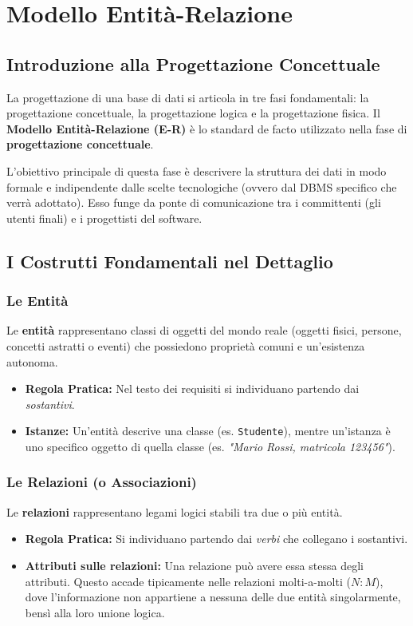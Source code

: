 \chapter{Modello Entità-Relazione}

\section{Introduzione alla Progettazione Concettuale}
La progettazione di una base di dati si articola in tre fasi fondamentali: la progettazione concettuale, la progettazione logica e la progettazione fisica. Il \textbf{Modello Entità-Relazione (E-R)} è lo standard de facto utilizzato nella fase di \textbf{progettazione concettuale}.

L'obiettivo principale di questa fase è descrivere la struttura dei dati in modo formale e indipendente dalle scelte tecnologiche (ovvero dal DBMS specifico che verrà adottato). Esso funge da ponte di comunicazione tra i committenti (gli utenti finali) e i progettisti del software.

\section{I Costrutti Fondamentali nel Dettaglio}

\subsection{Le Entità}
Le \textbf{entità} rappresentano classi di oggetti del mondo reale (oggetti fisici, persone, concetti astratti o eventi) che possiedono proprietà comuni e un'esistenza autonoma.
\begin{itemize}
    \item \textbf{Regola Pratica:} Nel testo dei requisiti si individuano partendo dai \textit{sostantivi}.
    \item \textbf{Istanze:} Un'entità descrive una classe (es. \texttt{Studente}), mentre un'istanza è uno specifico oggetto di quella classe (es. \textit{"Mario Rossi, matricola 123456"}).
\end{itemize}

\subsection{Le Relazioni (o Associazioni)}
Le \textbf{relazioni} rappresentano legami logici stabili tra due o più entità.
\begin{itemize}
    \item \textbf{Regola Pratica:} Si individuano partendo dai \textit{verbi} che collegano i sostantivi.
    \item \textbf{Attributi sulle relazioni:} Una relazione può avere essa stessa degli attributi. Questo accade tipicamente nelle relazioni molti-a-molti ($N:M$), dove l'informazione non appartiene a nessuna delle due entità singolarmente, bensì alla loro unione logica.
\end{itemize}

